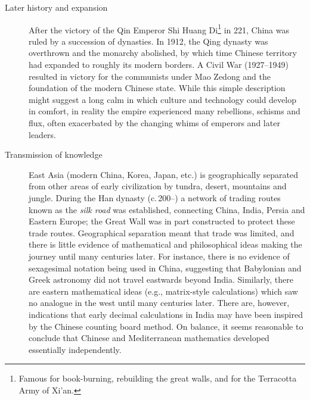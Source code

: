 \begin{description}
  \item[Later history and expansion] After the victory of the Qin Emperor Shi Huang Di\footnote{Famous for book-burning, rebuilding the great walls, and for the Terracotta Army of Xi'an.} in 221\BC, China was ruled by a succession of dynasties. In 1912, the Qing dynasty was overthrown and the monarchy abolished, by which time Chinese territory had expanded to roughly its modern borders. A Civil War (1927--1949) resulted in victory for the communists under Mao Zedong and the foundation of the modern Chinese state. While this simple description might suggest a long calm in which culture and technology could develop in comfort, in reality the empire experienced many rebellions, schisms and flux, often exacerbated by the changing whims of emperors and later leaders.
  
  \item[Transmission of knowledge] East Asia (modern China, Korea, Japan, etc.) is geographically separated from other areas of early civilization by tundra, desert, mountains and jungle. During the Han dynasty (c.\,200\BC--) a network of trading routes known as the \emph{silk road} was established, connecting China, India, Persia and Eastern Europe; the Great Wall was in part constructed to protect these trade routes. Geographical separation meant that trade was limited, and there is little evidence of mathematical and philosophical ideas making the journey until many centuries later. For instance, there is no evidence of sexagesimal notation being used in China, suggesting that Babylonian and Greek astronomy did not travel eastwards beyond India. Similarly, there are eastern mathematical ideas (e.g., matrix-style calculations) which saw no analogue in the west until many centuries later. There are, however, indications that early decimal calculations in India may have been inspired by the Chinese counting board method. On balance, it seems reasonable to conclude that Chinese and Mediterranean mathematics developed essentially independently.
\end{description}

\goodbreak



